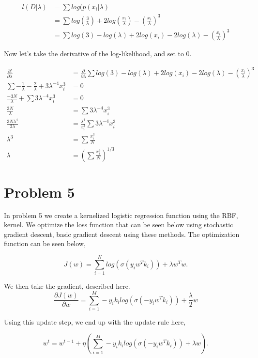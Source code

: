 \documentclass[paper=a4, fontsize=11pt]{scrartcl} %
\begin{document}
\begin{align}
l(D|\lambda) &= \sum log(p(x_i|\lambda) \\
&= \sum log(\frac{3}{\lambda})+2log(\frac{x_i}{\lambda})-(\frac{x_i}{\lambda})^3 \\
&= \sum log(3) - log(\lambda) +2log(x_i) - 2log(\lambda) -(\frac{x_i}{\lambda})^3 
\end{align}

Now let's take the derivative of the log-likelihood, and set to 0.

\begin{align}
\frac{\partial l}{\partial \lambda} &=\frac{\partial}{\partial \lambda} \sum log(3) - log(\lambda) +2log(x_i) - 2log(\lambda) -(\frac{x_i}{\lambda})^3 \\
\sum -\frac{1}{\lambda} - \frac{2}{\lambda}  + 3\lambda^{-4}x_i^{3} &= 0 \\
\frac{-3N}{\lambda} + \sum 3\lambda^{-4}x_i^{3} &= 0 \\
 \frac{3N}{\lambda} &=  \sum 3\lambda^{-4}x_i^{3} \\ 
\frac{3N\lambda^4}{3\lambda} &= \frac{\lambda^4}{x_i^3} \sum 3\lambda^{-4}x_i^{3} \\
\lambda^3 &= \sum \frac{x_i^{3}}{N} \\
\lambda &= (\sum \frac{x_i^{3}}{N})^{1/3}
\end{align}

\section{Problem 5}
In problem 5 we create a kernelized logistic regression function using the RBF, kernel.
We optimize the loss function that can be seen below using stochastic gradient descent, basic gradient descent using these methods. The optimization function can be seen below,

\begin{equation}
J(w) = \sum\limits_{i=1}^N log(\sigma(y_i w^T k_i)) + \lambda w^T w.
\end{equation}

We then take the gradient, described here.
\begin{equation}
\frac{\partial J(w)}{\partial w} = \sum\limits_{i=1}^M -y_i  k_i log(\sigma(-y_i w^T k_i)) + \frac{\lambda}{2}  w
\end{equation}

Using this update step, we end up with the update rule here,

\begin{equation}
w^{t} = w^{t-1} + \eta (  \sum\limits_{i=1}^M -y_i  k_i log(\sigma(-y_i w^T k_i)) + \lambda w).
\end{equation}
\end{document}
